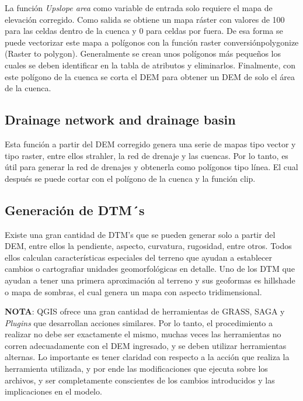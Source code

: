 \documentclass[a4paper,oneside,11pt,]{article}
\begin{document}
La función \emph{Upslope area} como variable de entrada solo requiere el mapa de elevación corregido. Como salida se obtiene un mapa ráster con valores de 100 para las celdas dentro de la cuenca y 0 para celdas por fuera. De esa forma se puede vectorizar este mapa a polígonos con la función raster \textrightarrow conversión\textrightarrow polygonize (Raster to polygon). Generalmente se crean unos polígonos más pequeños los cuales se deben identificar en la tabla de atributos y eliminarlos. Finalmente, con este polígono de la cuenca se corta el DEM para obtener un DEM de solo el área de la cuenca.

\subsection{Drainage network and drainage basin}

Esta función a partir del DEM corregido genera una serie de mapas tipo vector y tipo raster, entre ellos strahler, la red de drenaje y las cuencas. Por lo tanto, es útil para generar la red de drenajes y obtenerla como polígonos tipo línea. El cual después se puede cortar con el polígono de la cuenca y la función clip.

\subsection{Generación de DTM´s}

Existe una gran cantidad de DTM’s que se pueden generar solo a partir del DEM, entre ellos la pendiente, aspecto, curvatura, rugosidad, entre otros. Todos ellos calculan características especiales del terreno que ayudan a establecer cambios o cartografiar unidades geomorfológicas en detalle. 
Uno de los DTM que ayudan a tener una primera aproximación al terreno y sus geoformas es hillshade o mapa de sombras, el cual genera un mapa con aspecto tridimensional.\\

\begin{minipage}{27em}
\textbf{NOTA}: QGIS ofrece una gran cantidad de herramientas de GRASS, SAGA y \emph{Plugins} que desarrollan acciones similares. Por lo tanto, el procedimiento a realizar no debe ser exactamente el mismo, muchas veces las herramientas no corren adecuadamente con el DEM ingresado, y se deben utilizar herramientas alternas. Lo importante es tener claridad con respecto a la acción que realiza la herramienta utilizada, y por ende las modificaciones que ejecuta sobre los archivos, y ser completamente conscientes de los cambios introducidos y las implicaciones en el modelo.
\end{minipage}
\end{document}
